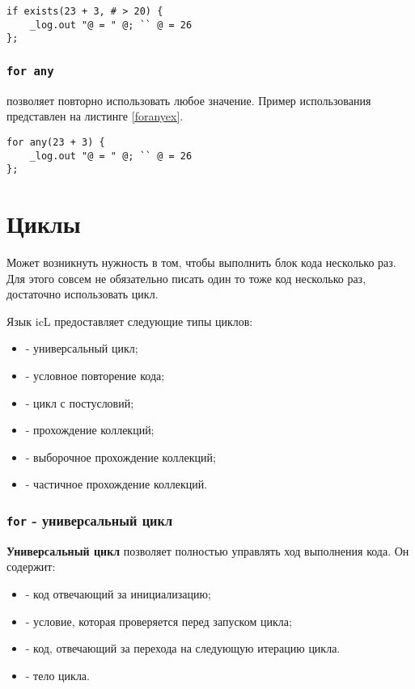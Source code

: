 \documentclass[a4paper, 14pt]{extarticle}
\newenvironment{icItems}
	{ \begin{itemize} [noitemsep,nolistsep] }
	{ \end{itemize} }
\begin{document}
\begin{lstlisting}[caption=Использование if exist, label=ifexistsex]
if exists(23 + 3, # > 20) {
	_log.out "@ = " @; `` @ = 26
};
\end{lstlisting}

\subsubsection{\lstinline`for any`}

 позволяет повторно использовать любое значение. Пример использования представлен на листинге \ref{foranyex}.

\begin{lstlisting}[caption=Использование for any, label=foranyex]
for any(23 + 3) {
	_log.out "@ = " @; `` @ = 26
};
\end{lstlisting}

\section{Циклы}

Может возникнуть нужность в том, чтобы выполнить блок кода несколько раз. Для этого совсем не обязательно писать один то тоже код несколько раз, достаточно использовать цикл.

Язык icL предоставляет следующие типы циклов:

\begin{icItems}
\item
	 - универсальный цикл;
\item
	 - условное повторение кода;
\item
	 - цикл с постусловий;
\item
	 - прохождение коллекций;
\item
	 - выборочное прохождение коллекций;
\item
	 - частичное прохождение коллекций.
\end{icItems}


\subsubsection{\lstinline`for` - универсальный цикл}

{\bf Универсальный цикл} позволяет полностью управлять ход выполнения кода. Он содержит:

\begin{icItems}
\item
	 - код отвечающий за инициализацию;
\item
	 - условие, которая проверяется перед запуском цикла;
\item
	 - код, отвечающий за перехода на следующую итерацию цикла.
\item
	 - тело цикла.
\end{icItems}
\end{document}
